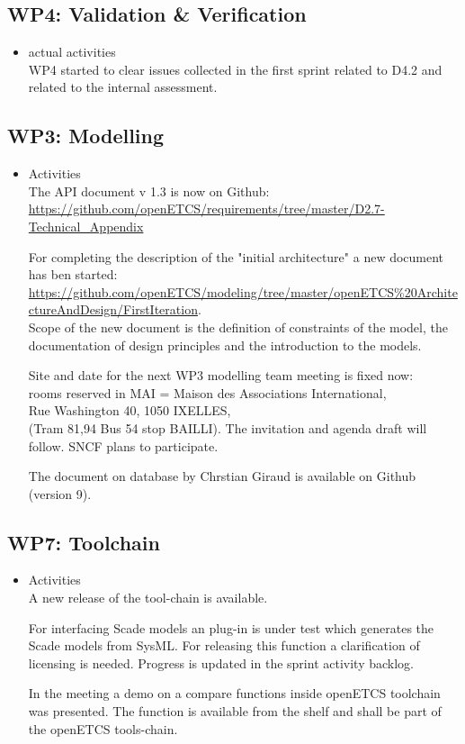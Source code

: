 \documentclass[a4paper, 11pt]{article}
\begin{document}
\subsection{WP4: Validation \& Verification}
\begin{itemize}
\item actual activities\\
WP4 started to clear issues collected in the first sprint related to D4.2 and related to the internal assessment.

\end{itemize}

\subsection{WP3: Modelling}

\begin{itemize}
\item Activities\\
The API document v 1.3 is now on Github: \url{https://github.com/openETCS/requirements/tree/master/D2.7-Technical_Appendix}

For completing the description of the "initial architecture" a new document has ben started: \url{https://github.com/openETCS/modeling/tree/master/openETCS%20ArchitectureAndDesign/FirstIteration}.\\
Scope of the new document is the definition of constraints of the model, the documentation of design principles and the introduction to the models.

Site and date for the next WP3 modelling team meeting is fixed now:\\
rooms reserved in MAI = Maison des Associations International,\\
Rue Washington 40, 1050 IXELLES,\\
(Tram 81,94 Bus 54 stop BAILLI). The invitation and agenda draft will follow. SNCF plans to participate.

The document on database by Chrstian Giraud is available on Github (version 9).

\end{itemize}

\subsection{WP7: Toolchain}

\begin{itemize}
\item Activities\\
A new release of the tool-chain is available. 

For interfacing Scade models an plug-in is under test which generates the Scade models from SysML.  For releasing this function a clarification of licensing is needed.
Progress is updated in the sprint activity backlog.

In the meeting a demo on a compare functions inside openETCS toolchain was presented. The function is available from the shelf and shall be part of the openETCS tools-chain.

\end{itemize}
\end{document}
